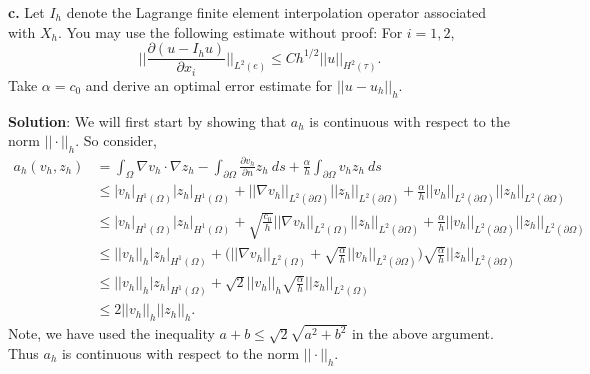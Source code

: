 \documentclass[11pt]{article}
\begin{document}
\vskip 2cm



\textbf{c.} Let $I_h$ denote the Lagrange finite element interpolation operator associated with $X_h$. 
You may use the following estimate without proof: For $i = 1,2$,
\begin{equation}
    \Big| \Big| \frac{\partial (u - I_h u)}{\partial x_i} \Big| \Big|_{L^2(e)} \leq Ch^{1/2} ||u||_{H^2(\tau)}.
\end{equation}
Take $\alpha = c_0$ and derive an optimal error estimate for $||u - u_h||_h$.


\vskip 1cm


\textbf{Solution}: We will first start by showing that $a_h$ is continuous with respect to the norm $||\cdot ||_h$.
So consider,
\begin{align*}
    a_h(v_h, z_h) &= \int_\Omega \nabla v_h \cdot \nabla z_h - \int_{\partial \Omega} \frac{\partial v_h}{\partial n} z_h \: ds + \frac{\alpha}{h} \int_{\partial \Omega} v_h z_h \: ds \\
    &\leq |v_h|_{H^1(\Omega)} |z_h|_{H^1(\Omega)} + ||\nabla v_h||_{L^2(\partial \Omega)} ||z_h||_{L^2(\partial \Omega)} + \frac{\alpha}{h} ||v_h||_{L^2(\partial \Omega)} ||z_h||_{L^2(\partial \Omega)} \\
    &\leq |v_h|_{H^1(\Omega)} |z_h|_{H^1(\Omega)} + \sqrt{\frac{c_0}{h}} ||\nabla v_h||_{L^2(\Omega)} ||z_h||_{L^2(\partial \Omega)} + \frac{\alpha}{h} ||v_h||_{L^2(\partial \Omega)} ||z_h||_{L^2(\partial \Omega)} \\ 
    &\leq ||v_h||_h |z_h|_{H^1(\Omega)} + \big( ||\nabla v_h||_{L^2(\Omega)} + \sqrt{\frac{\alpha}{h}} ||v_h||_{L^2(\partial \Omega)} \big) \sqrt{\frac{\alpha}{h}} ||z_h||_{L^2(\partial\Omega)} \\
    &\leq ||v_h||_h |z_h|_{H^1(\Omega)} + \sqrt{2} ||v_h||_h \sqrt{\frac{\alpha}{h}}||z_h||_{L^2(\Omega)} \\
    &\leq 2 ||v_h||_h ||z_h||_h.
\end{align*}
Note, we have used the inequality $a + b \leq \sqrt{2}\sqrt{a^2 + b^2}$ in the above argument.
Thus $a_h$ is continuous with respect to the norm $||\cdot ||_h$.
\end{document}
